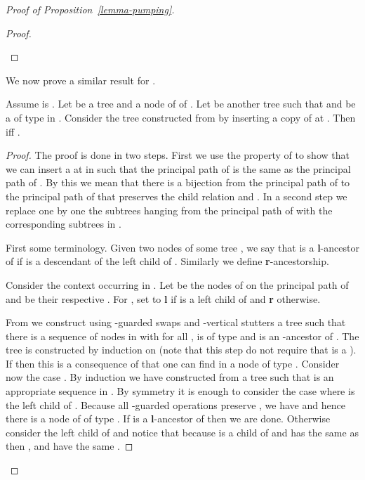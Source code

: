 \begin{proof}[Proof of Proposition~\ref{lemma-pumping}]
\begin{proof}
\begin{iteMize}{}
\begin{center}
\end{center}
\end{iteMize}
\end{proof}

We now prove a similar result for \kloops.

\begin{lem}\label{lemma-insert-loop}
  Assume  is \ktame. Let  be a tree and  a node of  of \ktype
  . Let  be another tree such that  and  be
  a \kloop of type  in . Consider the tree  constructed from 
  by inserting a copy of  at . Then  iff .
\end{lem}

\begin{proof} 

The proof is done in two steps. First we use the \ktame property
  of  to show that we can insert a \kloop  at  in  such that the
  principal path of  is the same as the principal path of . By this we
  mean that there is a bijection from the principal path of  to the
  principal path of  that preserves the child relation and .  In a second step we
  replace one by one the subtrees hanging from the principal path of  with
  the corresponding subtrees in .

  First some terminology. Given two nodes  of some tree , we say that
   is a {\bf l}-ancestor of  if  is a descendant of the left child of
  . Similarly we define {\bf r}-ancestorship.

  Consider the context  occurring in . Let  be the
  nodes of  on the principal path of  and  be
  their respective . For , set  to {\bf l}
  if  is a left child of  and {\bf r} otherwise.

  From  we construct using -guarded swaps and -vertical stutters a
  tree  such that there is a sequence of nodes  in 
  with for all ,  is of type  and  is an
  -ancestor of . The tree  is constructed by induction on
   (note that this step do not require that  is a \kloop).
  If  then this is a consequence of  that one
  can find in  a node of type .  Consider now the case . By
  induction we have constructed from  a tree  such that
   is an appropriate sequence in .  By symmetry it is
  enough to consider the case where  is the left child of .
  Because all -guarded operations preserve , we have
   and hence there is a node  of  of type
  . If  is a {\bf l}-ancestor of  then we are done.
  Otherwise consider the left child  of  and notice that because 
  is a child of  and  has the same  as
   then ,  and  have the same \ktype.


\end{proof}
\end{proof}

